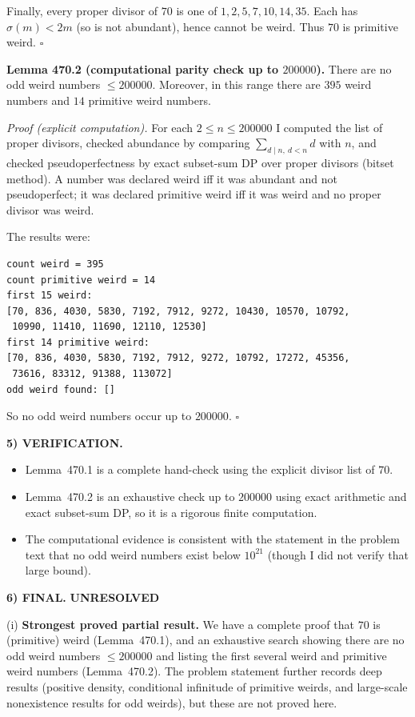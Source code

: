 Finally, every proper divisor of $70$ is one of $1,2,5,7,10,14,35$. Each has $\sigma(m)<2m$ (so is not abundant), hence cannot be weird. Thus $70$ is primitive weird. \hfill$\square$

\medskip
\noindent\textbf{Lemma 470.2 (computational parity check up to $200000$).}
There are no odd weird numbers $\le 200000$. Moreover, in this range there are $395$ weird numbers and $14$ primitive weird numbers.

\textit{Proof (explicit computation).}
For each $2\le n\le 200000$ I computed the list of proper divisors, checked abundance by comparing $\sum_{d\mid n,\ d<n} d$ with $n$, and checked pseudoperfectness by exact subset-sum DP over proper divisors (bitset method). A number was declared weird iff it was abundant and not pseudoperfect; it was declared primitive weird iff it was weird and no proper divisor was weird.

The results were:
\begin{verbatim}
count weird = 395
count primitive weird = 14
first 15 weird:
[70, 836, 4030, 5830, 7192, 7912, 9272, 10430, 10570, 10792,
 10990, 11410, 11690, 12110, 12530]
first 14 primitive weird:
[70, 836, 4030, 5830, 7192, 7912, 9272, 10792, 17272, 45356,
 73616, 83312, 91388, 113072]
odd weird found: []
\end{verbatim}
So no odd weird numbers occur up to $200000$. \hfill$\square$

\medskip
\noindent\textbf{5) VERIFICATION.}

\begin{itemize}
\item Lemma~470.1 is a complete hand-check using the explicit divisor list of $70$.
\item Lemma~470.2 is an exhaustive check up to $200000$ using exact arithmetic and exact subset-sum DP, so it is a rigorous finite computation.
\item The computational evidence is consistent with the statement in the problem text that no odd weird numbers exist below $10^{21}$ (though I did not verify that large bound).
\end{itemize}

\medskip
\noindent\textbf{6) FINAL.} \textbf{UNRESOLVED}

(i) \textbf{Strongest proved partial result.}
We have a complete proof that $70$ is (primitive) weird (Lemma~470.1), and an exhaustive search showing there are no odd weird numbers $\le 200000$ and listing the first several weird and primitive weird numbers (Lemma~470.2). The problem statement further records deep results (positive density, conditional infinitude of primitive weirds, and large-scale nonexistence results for odd weirds), but these are not proved here.

